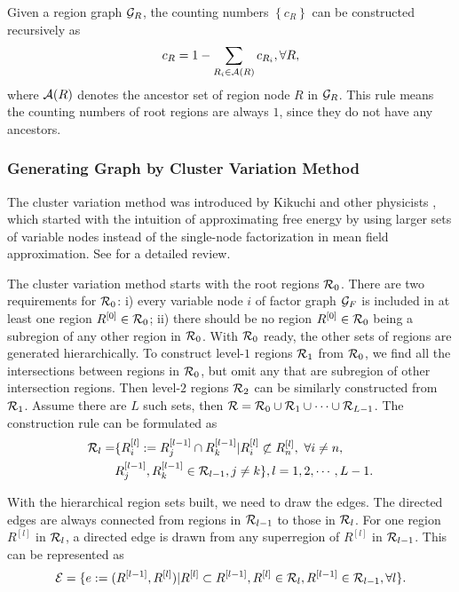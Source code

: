 Given a region graph $\mathcal{G}_R$, the counting numbers $\left\{ c_R \right\}$ can be constructed recursively as
\begin{equation}
  c_R = 1 - \sum_{R_i \in \mathcal{A}(R)} c_{R_i}, \forall R,
\end{equation}
where $\mathcal{A}(R)$ denotes the ancestor set of region node $R$ in $\mathcal{G}_R$. This rule means the counting numbers of root regions are always $1$, since they do not have any ancestors.


\subsubsection{Generating Graph by Cluster Variation Method}
\label{sec:cluster-variation-method}

The cluster variation method was introduced by Kikuchi and other physicists \cite{PhysRev.81.988,morita1991cluster}, which started with the intuition of approximating free energy by using larger sets of variable nodes instead of the single-node factorization in mean field approximation. See \cite{pelizzola2005cvm} for a detailed review.

The cluster variation method starts with the root regions $\mathcal{R}_0$. There are two requirements for $\mathcal{R}_0$: i) every variable node $i$ of factor graph $\mathcal{G}_F$ is included in at least one region $R^{[0]}\in\mathcal{R}_0$; ii) there should be no region $R^{[0]}\in \mathcal{R}_0$ being a subregion of any other region in $\mathcal{R}_0$.
With $\mathcal{R}_0$ ready, the other sets of regions are generated hierarchically. To construct level-$1$ regions $\mathcal{R}_1$ from $\mathcal{R}_0$, we find all the intersections between regions in $\mathcal{R}_0$, but omit any that are subregion of other intersection regions. Then level-$2$ regions $\mathcal{R}_2$ can be similarly constructed from $\mathcal{R}_1$. Assume there are $L$ such sets, then $\mathcal{R} = \mathcal{R}_0 \cup \mathcal{R}_1 \cup \cdots \cup \mathcal{R}_{L-1}$. The construction rule can be formulated as
\begin{align}
  \mathcal{R}_l = &\{ R^{[l]}_i := R^{[l-1]}_j \cap R^{[l-1]}_k | R^{[l]}_i \not\subset R^{[l]}_n,~ \forall i \neq n, \nonumber \\
          &R^{[l-1]}_j, R^{[l-1]}_k \in \mathcal{R}_{l-1} , j\neq k\}, l=1, 2, \cdots, L-1.
\end{align}

With the hierarchical region sets built, we need to draw the edges. The directed edges are always connected from regions in $\mathcal{R}_{l-1}$ to those in $\mathcal{R}_{l}$. For one region $R^{[l]}$ in $\mathcal{R}_l$, a directed edge is drawn from any superregion of $R^{[l]}$ in $\mathcal{R}_{l-1}$. This can be represented as
\begin{align}
  \mathcal{E} = \{ e := (R^{[l-1]}, R^{[l]}) | R^{[l]} \subset R^{[l-1]}, R^{[l]} \in \mathcal{R}_l, R^{[l-1]} \in \mathcal{R}_{l-1} , \forall l\}.
\end{align}



